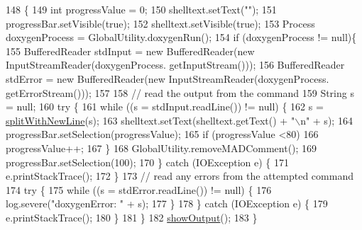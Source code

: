 \begin{DoxyCode}
148                               \{
149         \textcolor{keywordtype}{int} progressValue = 0;
150         shelltext.setText(\textcolor{stringliteral}{""});
151         progressBar.setVisible(\textcolor{keyword}{true});
152         shelltext.setVisible(\textcolor{keyword}{true});
153         Process doxygenProcess = GlobalUtility.doxygenRun();
154         \textcolor{keywordflow}{if} (doxygenProcess != null)\{
155             BufferedReader stdInput = \textcolor{keyword}{new} BufferedReader(\textcolor{keyword}{new} InputStreamReader(doxygenProcess.
      getInputStream()));
156             BufferedReader stdError = \textcolor{keyword}{new} BufferedReader(\textcolor{keyword}{new} InputStreamReader(doxygenProcess.
      getErrorStream()));
157 
158             \textcolor{comment}{// read the output from the command}
159             String s = null;
160             \textcolor{keywordflow}{try} \{
161                 \textcolor{keywordflow}{while} ((s = stdInput.readLine()) != null) \{
162                     s = \hyperlink{classit_1_1isislab_1_1masonassisteddocumentation_1_1mason_1_1wizards_1_1_q___end_wizard_a89adac239da36e67abac1ec9c416bba4}{splitWithNewLine}(s);
163                     shelltext.setText(shelltext.getText() + \textcolor{stringliteral}{"\(\backslash\)n"} + s);
164                     progressBar.setSelection(progressValue);
165                     \textcolor{keywordflow}{if} (progressValue <80)
166                         progressValue++;
167                 \}
168                 GlobalUtility.removeMADComment();
169                 progressBar.setSelection(100);
170             \} \textcolor{keywordflow}{catch} (IOException e) \{
171                 e.printStackTrace();
172             \}
173             \textcolor{comment}{// read any errors from the attempted command}
174             \textcolor{keywordflow}{try} \{
175                 \textcolor{keywordflow}{while} ((s = stdError.readLine()) != null) \{                 
176                     log.severe(\textcolor{stringliteral}{"doxygenError: "} + s);
177                 \}
178             \} \textcolor{keywordflow}{catch} (IOException e) \{
179                 e.printStackTrace();
180             \}
181         \}
182         \hyperlink{classit_1_1isislab_1_1masonassisteddocumentation_1_1mason_1_1wizards_1_1_q___end_wizard_a4564b1098ec942795cbd022ccbe338e0}{showOutput}();
183     \}
\end{DoxyCode}


